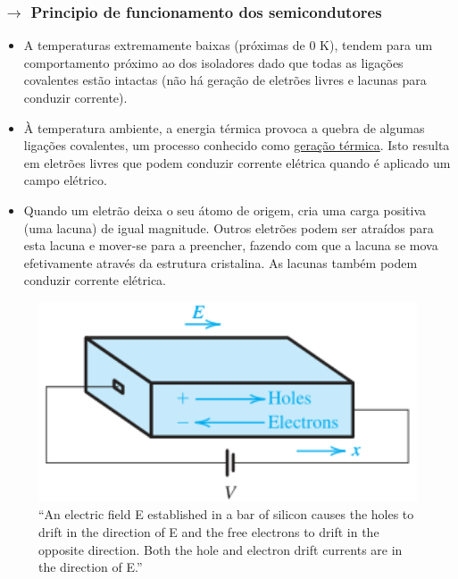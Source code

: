 \subsubsection[1.1.1 Principio de funcionamento dos semicondutores]{$\pmb{\rightarrow}$ Principio de funcionamento dos semicondutores}

\begin{itemize}
	\item A temperaturas extremamente baixas (próximas de 0 K), tendem para um comportamento próximo ao dos isoladores dado que todas as ligações covalentes estão intactas (não há geração de eletrões livres e lacunas para conduzir corrente).
 
	\item À temperatura ambiente, a energia térmica provoca a quebra de algumas ligações covalentes, um processo conhecido como \underline{geração térmica}. Isto resulta em eletrões livres que podem conduzir corrente elétrica quando é aplicado um campo elétrico.
 
    \item Quando um eletrão deixa o seu átomo de origem, cria uma carga positiva (uma lacuna) de igual magnitude. Outros eletrões podem ser atraídos para esta lacuna e mover-se para a preencher, fazendo com que a lacuna se mova efetivamente através da estrutura cristalina. As lacunas também podem conduzir corrente elétrica.
 \end{itemize}

\vspace{-1.0em}
\begin{figure}[H]
    \centering
    \begin{minipage}{0.35\textwidth}
        \includegraphics[width=1\textwidth]{img/1/bar-of-silicon.png}
    \end{minipage}
    \hfill
    \begin{minipage}{0.60\textwidth}
        \caption{``An electric field E established in a bar of silicon causes the holes to drift in the direction of E and the free electrons to drift in the opposite direction. Both the hole and electron drift currents are in the direction of E.''\cite{sedra-smith:microelectronic-circuits}}
    \end{minipage}
    \label{fig:bar-of-silicon}
\end{figure}

